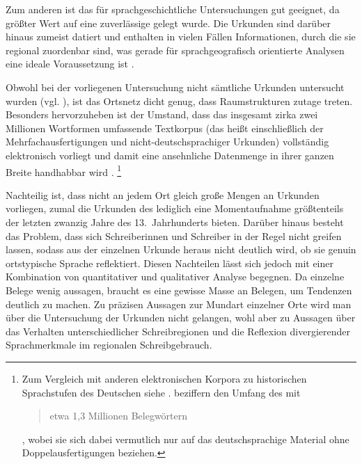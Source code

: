 Zum anderen ist das \CAO{} für sprachgeschichtliche
Untersuchungen gut geeignet, da größter Wert auf eine zuverlässige
 gelegt wurde. Die Urkunden sind darüber hinaus zumeist
datiert und enthalten in vielen Fällen Informationen, durch die sie regional
zuordenbar sind, was gerade für sprachgeografisch
orientierte Analysen eine ideale Voraussetzung ist
\autocites[7--8]{wmuovz}[22]{schulze2011}.

Obwohl bei der vorliegenen Untersuchung nicht sämtliche Urkunden
untersucht wurden (vgl. ), ist das Ortsnetz dicht genug,
dass Raumstrukturen zutage treten. Besonders hervorzuheben
ist der Umstand, dass das insgesamt zirka zwei Millionen Wortformen umfassende
Textkorpus (das heißt einschließlich der Mehrfachausfertigungen und
nicht-deutschsprachiger Urkunden) vollständig elektronisch vorliegt
\autocites{gniffkerapp2005}{cao-online} und damit eine ansehnliche Datenmenge
in ihrer ganzen Breite handhabbar wird
\autocite{beckerschallert2021,beckerschallert2022b}.%
%
	\footnote{Zum Vergleich mit anderen elektronischen Korpora zu
	historischen Sprachstufen des Deutschen siehe
	\citet{dipper2015}. \citet[391]{gniffkerapp2005} beziffern den Umfang des
	\CAO{} mit \blockquote{etwa 1,3 Millionen Belegwörtern}, wobei sie sich
	dabei vermutlich nur auf das deutschsprachige Material ohne
	Doppelausfertigungen beziehen.} %

Nachteilig ist, dass nicht an jedem Ort gleich große Mengen an
Urkunden vorliegen, zumal die Urkunden des \CAO{} lediglich eine
Momentaufnahme größtenteils der letzten zwanzig Jahre des 13.~Jahrhunderts
bieten. Darüber hinaus besteht das Problem, dass sich Schreiberinnen und
Schreiber in der Regel nicht greifen lassen, sodass
aus der einzelnen Urkunde heraus nicht deutlich wird, ob sie genuin
ortstypische Sprache reflektiert. Diesen Nachteilen lässt sich jedoch mit einer
Kombination von quantitativer und qualitativer Analyse begegnen. Da einzelne
Belege wenig aussagen, braucht es eine gewisse Masse an Belegen, um Tendenzen
deutlich zu machen. Zu präzisen Aus\-sagen zur Mundart
einzelner Orte wird man über die Untersuchung der Urkunden nicht gelangen, wohl
aber zu Aussagen über das Verhalten unterschiedlicher Schreibregionen und die
Reflexion divergierender Sprachmerkmale im regionalen Schreibgebrauch.


